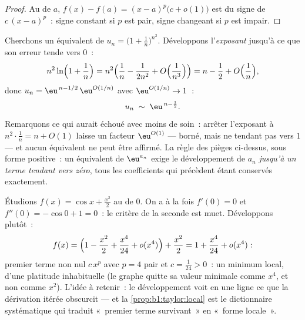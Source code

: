 \begin{proof}
Au  de $a$, $f(x) - f(a) = (x-a)^p\bigl(c + o(1)\bigr)$ est du
signe de $c\,(x-a)^p$~: signe constant si $p$ est pair, signe changeant
si $p$ est impair.
\end{proof}

\begin{example}\label{ex:b1:taylor:expdiscipline}
Cherchons un équivalent de $u_n = \bigl(1 + \frac1n\bigr)^{n^2}$.
Développons l'\emph{exposant} jusqu'à ce que son erreur tende vers
$0$~:
\[
n^2 \ln\Bigl(1 + \frac1n\Bigr)
= n^2\Bigl(\frac1n - \frac{1}{2n^2} +
O\Bigl(\frac{1}{n^3}\Bigr)\Bigr)
= n - \frac12 + O\Bigl(\frac1n\Bigr),
\]
donc $u_n = \eu^{\,n - 1/2}\,\eu^{O(1/n)}$ avec $\eu^{O(1/n)} \to
1$~:
\[
u_n \;\sim\; \eu^{\,n - \frac12} .
\]
Remarquons ce qui aurait échoué avec moins de soin~: arrêter
l'exposant à $n^2\cdot\frac1n = n + O(1)$ laisse un facteur
$\eu^{O(1)}$ --- borné, mais ne tendant pas vers $1$ --- et
aucun équivalent ne peut être affirmé. La règle des pièges
ci-dessus, sous forme positive~: un équivalent de
$\eu^{a_n}$ exige le développement de $a_n$ \emph{jusqu'à un terme
tendant vers zéro}, tous les coefficients qui précèdent étant
conservés exactement.
\end{example}

\begin{example}\label{ex:b1:taylor:flatmin}
Étudions $f(x) = \cos x + \frac{x^2}{2}$ au  de $0$. On a à
la fois $f'(0) = 0$ et $f''(0) = -\cos 0 + 1 = 0$~: le critère de la
 seconde est muet. Développons plutôt~:
\[
f(x) = \Bigl(1 - \frac{x^2}{2} + \frac{x^4}{24} +
o(x^4)\Bigr) + \frac{x^2}{2}
= 1 + \frac{x^4}{24} + o(x^4) :
\]
premier terme non nul $c\,x^p$ avec $p = 4$ pair et $c =
\frac{1}{24} > 0$~: un minimum local, d'une platitude inhabituelle
(le graphe quitte sa valeur minimale comme $x^4$, et non comme
$x^2$). L'idée à retenir~: le développement voit en une ligne ce que
la dérivation itérée obscurcit --- et la \cref{prop:b1:taylor:local}
est le dictionnaire systématique qui traduit «~premier terme
survivant~» en «~forme locale~».
\end{example}

